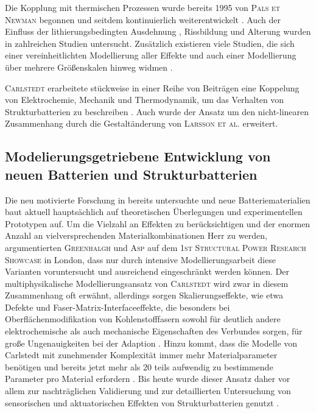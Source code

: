 Die Kopplung mit thermischen Prozessen wurde bereits 1995 von \textsc{Pals et Newman} \cite{Pals1995,Pals1995a} begonnen und seitdem kontinuierlich weiterentwickelt \cite{Chen2005,Onda2006,Kim2013,Gao2021,Liu2023}. Auch der Einfluss der lithierungsbedingten Ausdehnung \cite{Bower2011,Yang2014,Roberts2014,Pereira2019,Mai2019,Li2020,Hoeschele2023}, Rissbildung \cite{Dionisi2017,Wang2020a,Pistorio2023} und Alterung \cite{RedondoIglesias2020} wurden in zahlreichen Studien untersucht. Zusätzlich existieren viele Studien, die sich einer vereinheitlichten Modellierung aller Effekte \cite{Wu2014,Kim2018,Liu2020,Yin2020} und auch einer Modellierung über mehrere Größenskalen hinweg widmen \cite{Liu2019,Li2020a,Katrasnik2021}.

\textsc{Carlstedt} erarbeitete stückweise in einer Reihe von Beiträgen eine Koppelung von Elektrochemie, Mechanik und Thermodynamik, um das Verhalten von Strukturbatterien zu beschreiben \cite{Carlstedt2019,Carlstedt2019a,Carlstedt2019b,Carlstedt2020,Carlstedt2020b,Carlstedt2022,Carlstedt2022a,Carlstedt2022b}. Auch wurde der Ansatz um den nicht-linearen Zusammenhang durch die Gestaltänderung von \textsc{Larsson et al.} \cite{Larsson2023} erweitert.

\subsection{Modelierungsgetriebene Entwicklung von neuen Batterien und Strukturbatterien}

Die neu motivierte Forschung in bereits untersuchte und neue Batteriematerialien baut aktuell hauptsächlich auf theoretischen Überlegungen und experimentellen Prototypen auf. Um die Vielzahl an Effekten zu berücksichtigen und der enormen Anzahl an vielversprechenden Materialkombinationen Herr zu werden, argumentierten \textsc{Greenhalgh} \cite{Greenhalgh2024,Greenhalgh2024a} und \textsc{Asp} \cite{Asp2024} auf dem \textsc{1st Structural Power Research Showcase} in London, dass nur durch intensive Modellierungsarbeit diese Varianten voruntersucht und ausreichend eingeschränkt werden können. Der multiphysikalische Modellierungsansatz von \textsc{Carlstedt} wird zwar in diesem Zusammenhang oft erwähnt, allerdings sorgen Skalierungseffekte, wie etwa Defekte und Faser-Matrix-Interfaceeffekte, die besonders bei Oberflächenmodifikation von Kohlenstofffasern sowohl für deutlich andere elektrochemische als auch mechanische Eigenschaften des Verbundes sorgen, für große Ungenauigkeiten bei der Adaption \cite{Franco2019,Fam2024}. Hinzu kommt, dass die Modelle von Carlstedt mit zunehmender Komplexität immer mehr Materialparameter benötigen und bereits jetzt mehr als 20 teils aufwendig zu bestimmende Parameter pro Material erfordern \cite{Greenhalgh2024a}. Bis heute wurde dieser Ansatz daher vor allem zur nachträglichen Validierung und zur detaillierten Untersuchung von sensorischen und aktuatorischen Effekten von Strukturbatterien genutzt \cite{Carlstedt2023}.


